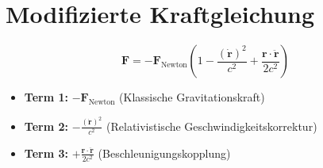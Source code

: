 \section{Modifizierte Kraftgleichung}
\[
\mathbf{F} = -\mathbf{F}_\text{Newton} \left(1 - \frac{(\dot{\mathbf{r}})^2}{c^2} + \frac{\mathbf{r} \cdot \ddot{\mathbf{r}}}{2c^2}\right)
\]

\begin{itemize}
    \item \textbf{Term 1:} \(-\mathbf{F}_\text{Newton}\) (Klassische Gravitationskraft)
    \item \textbf{Term 2:} \(-\frac{(\dot{\mathbf{r}})^2}{c^2}\) (Relativistische Geschwindigkeitskorrektur)
    \item \textbf{Term 3:} \(+\frac{\mathbf{r} \cdot \ddot{\mathbf{r}}}{2c^2}\) (Beschleunigungskopplung)
\end{itemize}